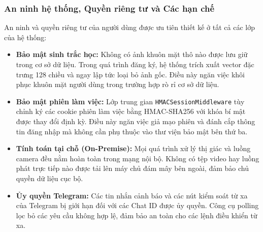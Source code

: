 \documentclass[12pt,a4paper]{article}
\begin{document}
\subsubsection*{An ninh hệ thống, Quyền riêng tư và Các hạn chế}
An ninh và quyền riêng tư của người dùng được ưu tiên thiết kế ở tất cả các lớp của hệ thống:
\begin{itemize}
    \item \textbf{Bảo mật sinh trắc học:} Không có ảnh khuôn mặt thô nào được lưu giữ trong cơ sở dữ liệu. Trong quá trình đăng ký, hệ thống trích xuất vector đặc trưng 128 chiều và ngay lập tức loại bỏ ảnh gốc. Điều này ngăn việc khôi phục khuôn mặt người dùng trong trường hợp rò rỉ cơ sở dữ liệu.
    \item \textbf{Bảo mật phiên làm việc:} Lớp trung gian \texttt{HMACSessionMiddleware} tùy chỉnh ký các cookie phiên làm việc bằng HMAC-SHA256 với khóa bí mật được thay đổi định kỳ. Điều này ngăn việc giả mạo phiên và đánh cắp thông tin đăng nhập mà không cần phụ thuộc vào thư viện bảo mật bên thứ ba.
    \item \textbf{Tính toán tại chỗ (On-Premise):} Mọi quá trình xử lý thị giác và luồng camera đều nằm hoàn toàn trong mạng nội bộ. Không có tệp video hay luồng phát trực tiếp nào được tải lên máy chủ đám mây bên ngoài, đảm bảo chủ quyền dữ liệu cục bộ.
    \item \textbf{Ủy quyền Telegram:} Các tin nhắn cảnh báo và các nút kiểm soát từ xa của Telegram bị giới hạn đối với các Chat ID được ủy quyền. Công cụ polling lọc bỏ các yêu cầu không hợp lệ, đảm bảo an toàn cho các lệnh điều khiển từ xa.
\end{itemize}
\end{document}
